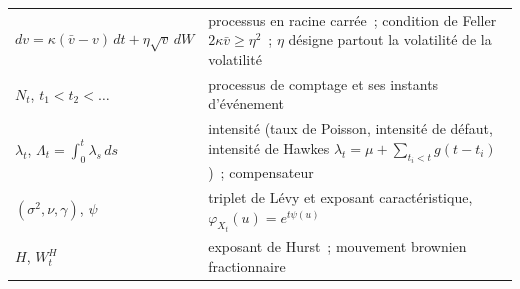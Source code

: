 \begin{notation}
{\begin{tabular}{@{}p{4.3cm}p{9.7cm}@{}}
$dv = \kappa(\bar v - v)\,dt + \eta\sqrt v\,dW$ & processus en racine carrée~; condition de Feller $2\kappa\bar v \ge \eta^2$~; $\eta$ désigne partout la volatilité de la volatilité \\
$N_t$, $t_1 < t_2 < \dots$ & processus de comptage et ses instants d'événement \\
$\lambda_t$, $\Lambda_t = \int_0^t\lambda_s\,ds$ & intensité (taux de Poisson, intensité de défaut, intensité de Hawkes $\lambda_t = \mu + \sum_{t_i < t}g(t - t_i)$)~; compensateur \\
$(\sigma^2, \nu, \gamma)$, $\psi$ & triplet de Lévy et exposant caractéristique, $\varphi_{X_t}(u) = e^{t\psi(u)}$ \\
$H$, $W^H_t$ & exposant de Hurst~; mouvement brownien fractionnaire \\
\bottomrule
\end{tabular}}
\end{notation}

